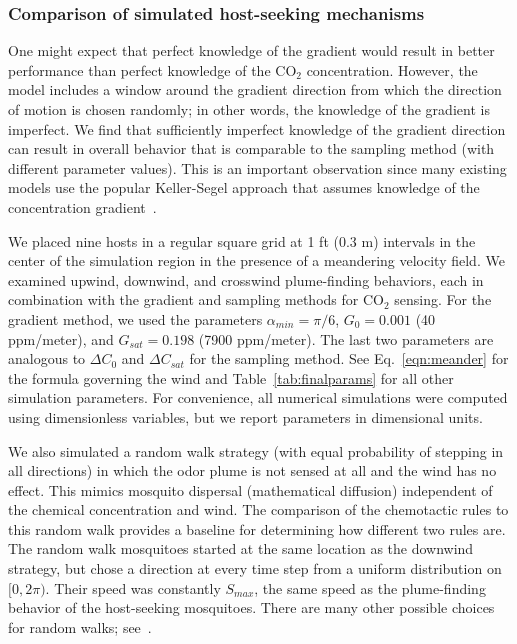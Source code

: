 \documentclass[10pt]{article}
\begin{document}
\subsubsection*{Comparison of simulated host-seeking mechanisms}

One might expect that perfect knowledge of the gradient would result in 
better performance than perfect knowledge of the $\mbox{CO}_2$ concentration.  However, the model 
includes a window around the gradient direction from which the direction of motion is chosen randomly; in other
words, the knowledge of the gradient is imperfect.  We find that sufficiently imperfect knowledge
of the gradient direction can result in overall behavior that is comparable to the sampling method (with
different parameter values).  This is an important observation since many existing models use the
popular Keller-Segel approach that assumes knowledge of the concentration 
gradient~\cite{KellerSegel,Horstmann}.

We placed nine hosts in a regular square grid at 1 ft (0.3 m) intervals in the center of the simulation region in the presence of a meandering velocity field. 
We examined upwind, downwind, and crosswind plume-finding behaviors, each in combination with the gradient and sampling methods for $\mbox{CO}_2$ sensing. For the gradient method, we used the parameters $\alpha_{min} = \pi/6$, $G_0 = 0.001$ (40 ppm/meter), and $G_{sat}=0.198$ (7900 ppm/meter). The last two parameters are analogous to $\Delta C_0$ and $\Delta C_{sat}$ for the sampling method. See Eq.~\eqref{eqn:meander} for the formula governing the wind and Table~\ref{tab:finalparams} for all other simulation parameters. For convenience, all numerical simulations were computed using dimensionless variables, but we report parameters in dimensional units.

We also simulated a random walk strategy (with 
equal probability of stepping in all directions) in which the odor plume is not sensed at all and the wind has no effect.  This 
mimics mosquito dispersal (mathematical diffusion) independent of the chemical concentration and wind.  The comparison of the
chemotactic rules to this random walk provides a baseline for determining how different two rules are.
The random walk mosquitoes started at the same location as the downwind strategy, but chose a direction at every time step from a uniform distribution on $[0,2\pi)$. Their speed was constantly $S_{max}$, the same speed as the plume-finding behavior of the host-seeking mosquitoes. There are many other possible choices for random walks; see~\cite{Pasternak2009}.
\end{document}
